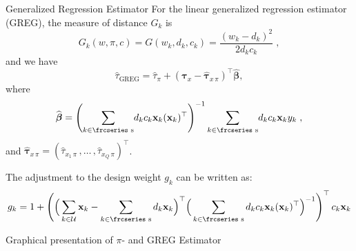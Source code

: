 \documentclass[10pt]{beamer}\usepackage[]{graphicx}\usepackage[]{color}
\newenvironment{knitrout}{}{} %
\newcommand{\textfrc}[1]{{\frcseries#1}}
\newcommand{\mathfrc}[1]{\text{\textfrc{#1}}}
\begin{document}
\begin{frame}{Generalized Regression Estimator}
For the linear generalized regression estimator (GREG), the measure of distance $G_k$ is
$$G_k(w,\pi,c)=G(w_k,d_k,c_k)=\dfrac{(w_k - d_k)^2}{2 d_k c_k} \;,$$
and we have
\begin{equation*}
\hat{\tau}_\text{GREG}= \hat{\tau}_\pi + \left( \boldsymbol{\tau}_{x}-
\hat{\boldsymbol{\tau}}_{x\,\pi}\right)^\top \widehat{\boldsymbol\beta},
\end{equation*}
where
\begin{equation*}
\widehat{\boldsymbol\beta}=\left( \underset{k \in \mathfrc{s} }{\sum }d_{k} c_k \mathbf{x}_{k} (\mathbf{x}_{k})^\top \right)^{-1}\underset{k \in \mathfrc{s}}{\sum } d_{k} c_k \mathbf{x}_{k} y_{k}\;{,}
\end{equation*}
and $\hat{\boldsymbol{\tau}}_{x\,\pi}=(\hat{\tau}_{x_1\,\pi}\,,\ldots\,,\hat{\tau}_{x_Q\,\pi} )^\top $.

The  adjustment to the design weight $g_k$ can be written as:
\begin{gather*}
g_k = 1 + \left(\Big(\sum_{k\in\mathcal{U}} \mathbf{x}_k - \sum_{k\in \mathfrc{s}} d_k \mathbf{x}_k\Big)^\top \Big(\sum_{k\in\mathfrc{s}} d_k c_k \mathbf{x}_k (\mathbf{x}_k)^\top \Big)^{-1}\right)^\top c_k \mathbf{x}_k
\end{gather*}
\end{frame}





\begin{frame}{Graphical presentation of $\pi$- and GREG Estimator}
 ~\\[-1.5cm]
\begin{knitrout}\footnotesize
{}\color{fgcolor}











{\centering {}

}



\end{knitrout}
\end{frame}
\end{document}
